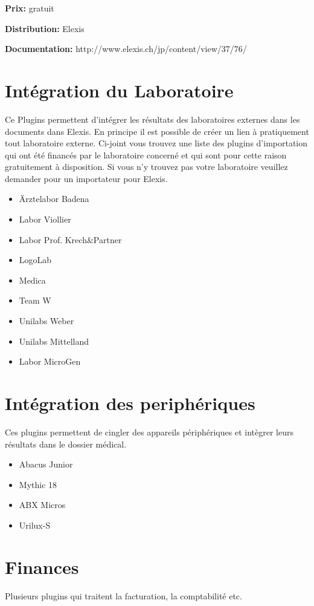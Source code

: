 \documentclass[paper=a4,BCOR8.25mm]{scrartcl}
\begin{document}
\textbf{Prix:} gratuit

\textbf{Distribution:} Elexis

\textbf{Documentation:} http://www.elexis.ch/jp/content/view/37/76/

\section{Intégration du Laboratoire}
Ce Plugins permettent d'intégrer les résultats des laboratoires externes dans les documents dans Elexis. En principe il est possible de créer un lien à pratiquement tout laboratoire externe. Ci-joint vous trouvez une liste des plugins d'importation qui ont été financés par le laboratoire concerné et qui sont pour cette raison gratuitement à disposition. Si vous n'y trouvez pas votre laboratoire veuillez demander pour un importateur pour Elexis. 

\begin{itemize}
\item Ärztelabor Badena
\item Labor Viollier
\item Labor Prof. Krech\&Partner
\item LogoLab
\item Medica
\item Team W
\item Unilabs Weber
\item Unilabs Mittelland
\item Labor MicroGen

\end{itemize}

\section{Intégration des periphériques}
Ces plugins permettent de cingler  des appareils périphériques et intègrer leurs résultats dans le dossier médical. 
\begin{itemize}
\item Abacus Junior
\item Mythic 18
\item ABX Micros
\item Urilux-S
\end{itemize}

\section{Finances}
Plusieurs plugins qui traitent la facturation, la comptabilité etc.
\end{document}
